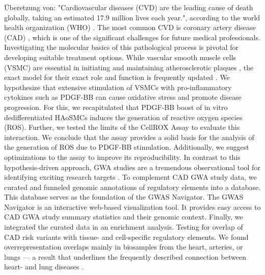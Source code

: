 Überetzung von:
"Cardiovascular diseases (CVD) are the leading cause of death globally, taking an estimated 17.9 million lives each year.", according to the world health organization (WHO) \cite{}. The most common CVD is coronary artery disease (CAD) \cite{}, which is one of the significant challenges for future medical professionals. Investigating the molecular basics of this pathological process is pivotal for developing suitable treatment options.
While vascular smooth muscle cells (VSMC) are essential in initiating and maintaining atherosclerotic plaques \cite{}, the exact model for their exact role and function is frequently updated \cite{}. We hypothesize that extensive stimulation of VSMCs with pro-inflammatory cytokines such as PDGF-BB can cause oxidative stress and promote disease progression.
For this, we recapitulated that PDGF-BB boost of in vitro dedifferentiated HAoSMCs induces the generation of reactive oxygen species (ROS). Further, we tested the limits of the CellROX Assay to evaluate this interaction. We conclude that the assay provides a solid basis for the analysis of the generation of ROS due to PDGF-BB stimulation. Additionally, we suggest optimizations to the assay to improve its reproducibility.
In contrast to this hypothesis-driven approach, GWA studies are a tremendous observational tool for identifying exciting research targets \cite{}.
To complement CAD GWA study data, we curated and funneled genomic annotations of regulatory elements into a database. This database serves as the foundation of the GWAS Navigator. The GWAS Navigator is an interactive web-based visualization tool. It provides easy access to CAD GWA study summary statistics and their genomic context.
Finally, we integrated the curated data in an enrichment analysis. Testing for overlap of CAD risk variants with tissue- and cell-specific regulatory elements. We found overrepresentation overlaps mainly in biosamples from the heart, arteries, or lungs — a result that underlines the frequently described connection between heart- and lung diseases \cite{}.
